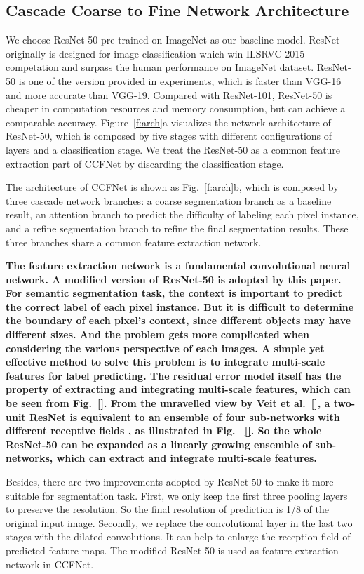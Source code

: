 \documentclass[10.5pt,compsoc]{TsT}
\theoremstyle{mystyle}
\begin{document}
{\subsection{Cascade Coarse to Fine Network Architecture}
\label{s:arch}
\noindent

We choose ResNet-50 pre-trained on ImageNet as our baseline model.
ResNet originally is designed for image classification which win ILSRVC 2015 competation and surpass the human performance on ImageNet dataset.
ResNet-50 is one of the version provided in experiments, which is faster than VGG-16 and more accurate than VGG-19.
Compared with ResNet-101, ResNet-50 is cheaper in computation resources and memory consumption, but can achieve a comparable accuracy.
Figure~\ref{f:arch}a  visualizes the network architecture of ResNet-50, which is composed by five stages with different configurations of layers and a classification stage.
We treat the ResNet-50 as a common feature extraction part of CCFNet by discarding the classification stage.


The architecture of CCFNet is shown as Fig.~\ref{f:arch}b, which is composed by three cascade network branches: a coarse segmentation branch as a baseline result, an attention branch to predict the difficulty of labeling each pixel instance, and a refine segmentation branch to refine the final segmentation results. 
These three branches share a common feature extraction network.

\bf{The feature extraction network} is a fundamental convolutional neural network.
A modified version of ResNet-50 is adopted by this paper.
For semantic segmentation task,  the context is important to predict the correct label of each pixel instance.
But it is difficult to determine the boundary of each pixel's context, since different objects may have different sizes.
And the problem gets more complicated when considering the various perspective of each images.
A simple yet effective method to solve this problem is to integrate multi-scale features for label predicting.
The residual error model itself has the property of extracting and integrating multi-scale features, which can be seen from Fig.~\ref{}.
From the unravelled view by Veit et al.~\ref{}, a two-unit ResNet is equivalent to an ensemble of four sub-networks with different receptive fields , as illustrated in Fig. ~\ref{}.
So the whole ResNet-50 can be expanded as a linearly growing ensemble of sub-networks, which can extract and integrate multi-scale features.

Besides, there are two improvements adopted by ResNet-50 to make it more suitable for segmentation task.
First, we only keep the first three pooling layers to preserve the resolution.
So the final resolution of prediction is 1/8 of the original input image. 
Secondly, we replace the convolutional layer in the last two stages with the dilated convolutions.
It can help to enlarge the reception field of predicted feature maps.
The modified ResNet-50 is used as feature extraction network in CCFNet.

}
\end{document}

